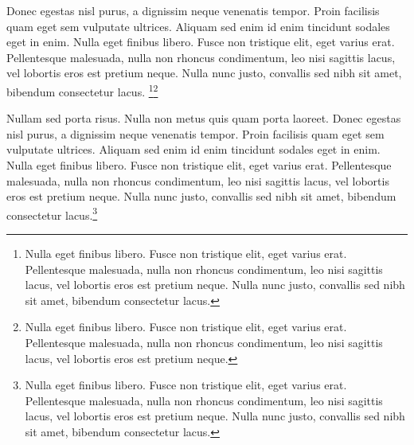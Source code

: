Donec egestas nisl purus, a dignissim neque venenatis tempor. Proin facilisis quam eget sem vulputate ultrices. Aliquam sed enim id enim tincidunt sodales eget in enim. Nulla eget finibus libero. Fusce non tristique elit, eget varius erat. Pellentesque malesuada, nulla non rhoncus condimentum, leo nisi sagittis lacus, vel lobortis eros est pretium neque. Nulla nunc justo, convallis sed nibh sit amet, bibendum consectetur lacus. \footnote{Nulla eget finibus libero. Fusce non tristique elit, eget varius erat. Pellentesque malesuada, nulla non rhoncus condimentum, leo nisi sagittis lacus, vel lobortis eros est pretium neque. Nulla nunc justo, convallis sed nibh sit amet, bibendum consectetur lacus.}\footnote{Nulla eget finibus libero. Fusce non tristique elit, eget varius erat. Pellentesque malesuada, nulla non rhoncus condimentum, leo nisi sagittis lacus, vel lobortis eros est pretium neque.}

Nullam sed porta risus. Nulla non metus quis quam porta laoreet. Donec egestas nisl purus, a dignissim neque venenatis tempor. Proin facilisis quam eget sem vulputate ultrices. Aliquam sed enim id enim tincidunt sodales eget in enim. Nulla eget finibus libero. Fusce non tristique elit, eget varius erat. Pellentesque malesuada, nulla non rhoncus condimentum, leo nisi sagittis lacus, vel lobortis eros est pretium neque. Nulla nunc justo, convallis sed nibh sit amet, bibendum consectetur lacus.\footnote{Nulla eget finibus libero. Fusce non tristique elit, eget varius erat. Pellentesque malesuada, nulla non rhoncus condimentum, leo nisi sagittis lacus, vel lobortis eros est pretium neque. Nulla nunc justo, convallis sed nibh sit amet, bibendum consectetur lacus.}


